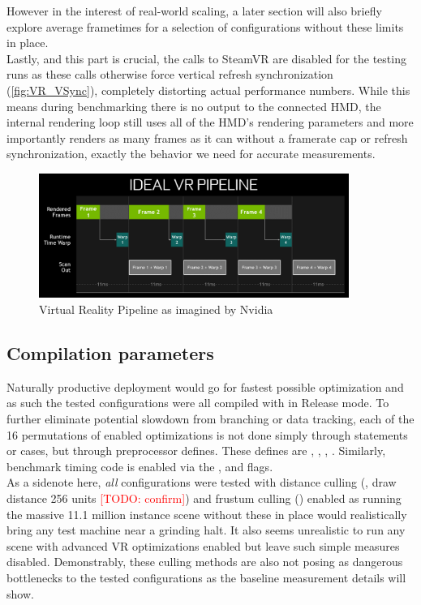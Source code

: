 However in the interest of real-world scaling, a later section will also briefly explore average frametimes for a selection of configurations without these limits in place. \\
Lastly, and this part is crucial, the  calls to SteamVR are disabled for the testing runs as these calls otherwise force vertical refresh synchronization (\autoref{fig:VR_VSync}), completely distorting actual performance numbers. While this means during benchmarking there is no output to the connected HMD, the internal rendering loop still uses all of the HMD's rendering parameters and more importantly renders as many frames as it can without a framerate cap or refresh synchronization, exactly the behavior we need for accurate measurements. 

\begin{figure}[htb]
  \centering
  \includegraphics[width=0.9\textwidth]{pictures/Nvidia_FCAT}
  \caption{Virtual Reality Pipeline as imagined by Nvidia\cite{Cleveland.2017}} \label{fig:VR_VSync}
\end{figure} 


\subsection{Compilation parameters}
Naturally productive deployment would go for fastest possible optimization and as such the tested configurations were all compiled with  in Release mode. 
To further eliminate potential slowdown from branching or data tracking, each of the 16 permutations of enabled optimizations is not done simply through  statements or  cases, but through preprocessor defines. These defines are , , , . Similarly, benchmark timing code is enabled via the ,  and  flags. \\
As a sidenote here, \textit{all} configurations were tested with distance culling (, draw distance 256 units \textcolor{red}{[TODO: confirm]}) and frustum culling () enabled as running the massive 11.1 million instance scene without these in place would realistically bring any test machine near a grinding halt. It also seems unrealistic to run any scene with advanced VR optimizations enabled but leave such simple measures disabled. 
Demonstrably, these culling methods are also not posing as dangerous bottlenecks to the tested configurations as the baseline measurement details will show. 

